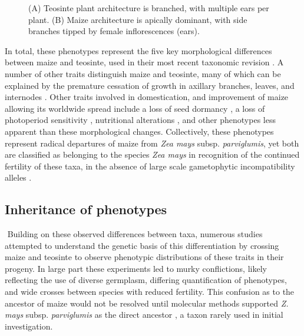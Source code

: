 \documentclass[9pt,twocolumn,twoside]{rilabRxiv}
\begin{document}
   \begin{figure}
        \caption{\label{fig:provance} (A) Teosinte plant architecture is branched, with multiple ears per plant. (B) Maize architecture is apically dominant, with side branches tipped by female inflorescences (ears). }
\end{figure}



﻿In total, these phenotypes represent the five key morphological differences between maize and teosinte, used in their most recent taxonomic revision \citep{doebley1980, iltis1980}.
A number of other traits distinguish maize and teosinte, many of which can be explained by the premature cessation of growth in axillary branches, leaves, and internodes \citep{doebley1980}.
Other traits involved in domestication, and improvement of maize allowing its worldwide spread include a loss of seed dormancy \citep{avendanolopez2011}, a loss of photoperiod sensitivity \citep{huang2017}, nutritional alterations \citep{hanson1996, whitt2002}, and other phenotypes less apparent than these morphological changes. %
Collectively, these phenotypes represent radical departures of maize from \textit{Zea mays} subsp. \textit{parviglumis}, yet both are classified as belonging to the species \textit{Zea mays} in recognition of the continued fertility of these taxa, in the absence of large scale gametophytic incompatibility alleles \citep{kermicle2006}.


\subsection*{Inheritance of phenotypes}

﻿
﻿Building on these observed differences between taxa, numerous studies attempted to understand the genetic basis of this differentiation by crossing maize and teosinte to observe phenotypic distributions of these traits in their progeny.
In large part these experiments led to murky conflictions, likely reflecting the use of diverse germplasm, differing quantification of phenotypes, and wide crosses between species with reduced fertility.
This confusion as to the ancestor of maize would not be resolved until molecular methods supported \textit{Z. mays} subsp. \textit{parviglumis} as the direct ancestor \citep{bennetzen2001}, a taxon rarely used in initial investigation.
\end{document}
